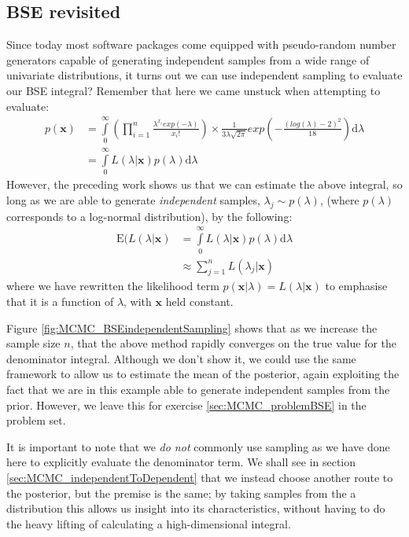 \documentclass[11pt,fullpage]{book}
\begin{document}
\subsection{BSE revisited}
Since today most software packages come equipped with pseudo-random number generators capable of generating independent samples from a wide range of univariate distributions, it turns out we can use independent sampling to evaluate our BSE integral? Remember that here we came unstuck when attempting to evaluate:
%
\begin{equation}\label{eq:MCMC_denominatorBSE2}
\begin{align}
p(\boldsymbol{x}) &= \int\limits_{0}^{\infty}\left(\prod\limits_{i=1}^{n} \frac{\lambda^{x_i} exp(-\lambda)}{x_i!}\right) \times \frac{1}{3\lambda\sqrt{2\pi}} exp\left(-\frac{(log(\lambda)-2)^2}{18}\right)\mathrm{d}\lambda\\
&= \int\limits_{0}^{\infty} L(\lambda|\boldsymbol{x}) p(\lambda)\mathrm{d}\lambda
\end{align}
\end{equation} 
%
However, the preceding work shows us that we can estimate the above integral, so long as we are able to generate \textit{independent} samples, $\lambda_j\sim p(\lambda)$, (where $p(\lambda)$ corresponds to a log-normal distribution), by the following:
%
\begin{equation}
\begin{align}
\mathrm{E}(L(\lambda|\boldsymbol{x}) &= \int\limits_{0}^{\infty} L(\lambda|\boldsymbol{x}) p(\lambda)\mathrm{d}\lambda\\
&\approx \sum\limits_{j=1}^{n} L(\lambda_j|\boldsymbol{x})
\end{align}
\end{equation}
%
where we have rewritten the likelihood term $p(\boldsymbol{x}|\lambda)=L(\lambda|\boldsymbol{x})$ to emphasise that it is a function of $\lambda$, with $\boldsymbol{x}$ held constant.

Figure \ref{fig:MCMC_BSEindependentSampling} shows that as we increase the sample size $n$, that the above method rapidly converges on the true value for the denominator integral. Although we don't show it, we could use the same framework to allow us to estimate the mean of the posterior, again exploiting the fact that we are in this example able to generate independent samples from the prior. However, we leave this for exercise \ref{sec:MCMC_problemBSE} in the problem set.

It is important to note that we \textit{do not} commonly use sampling as we have done here to explicitly evaluate the denominator term. We shall see in section \ref{sec:MCMC_independentToDependent} that we instead choose another route to the posterior, but the premise is the same; by taking samples from the a distribution this allows us insight into its characteristics, without having to do the heavy lifting of calculating a high-dimensional integral.
\end{document}
